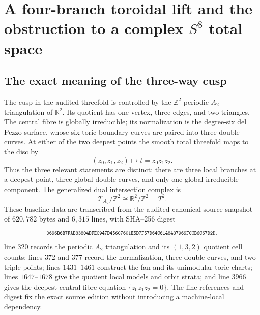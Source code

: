 
\section{A four-branch toroidal lift and the obstruction to a complex
\texorpdfstring{$S^8$}{S8} total space}
\label{hrftd:section}

\subsection{The exact meaning of the three-way cusp}
\label{hrftd:baseline}

The cusp in the audited threefold is controlled by the
\(\mathbb Z^2\)-periodic \(A_2\)-triangulation of \(\mathbb R^2\).  Its
quotient has one vertex, three edges, and two triangles.  The central fibre
is globally irreducible; its normalization is the degree-six del Pezzo
surface, whose six toric boundary curves are paired into three double curves.
At either of the two deepest points the smooth total threefold maps to the
disc by
\begin{equation}
 (z_0,z_1,z_2)\longmapsto t=z_0z_1z_2.
 \label{hrftd:eq:three-branch}
\end{equation}
Thus the three relevant statements are distinct: there are three local
branches at a deepest point, three global double curves, and only one global
irreducible component.  The generalized dual intersection complex is
\begin{equation}
 \mathcal T_{A_2}/\mathbb Z^2
 \cong \mathbb R^2/\mathbb Z^2=T^2.
 \label{hrftd:eq:dual-torus-two}
\end{equation}
These baseline data are transcribed from the audited canonical-source
snapshot of \(620{,}782\) bytes and \(6{,}315\) lines, with SHA--256 digest
\[
 \text{\scriptsize\ttfamily
 0696B6B7FAB83804DFEC947D45607601E5D7F57D64C6148487969FCCB6C67D2D}.
\]
line \(320\) records the periodic \(A_2\) triangulation and its
\((1,3,2)\) quotient cell counts; lines \(372\) and \(377\) record the
normalization, three double curves, and two triple points; lines
\(1431\)--\(1461\) construct the fan and its unimodular toric charts;
lines \(1647\)--\(1678\) give the quotient local models and orbit strata;
and line \(3966\) gives the deepest central-fibre equation
\(\{z_0z_1z_2=0\}\).  The line references and digest fix the exact source
edition without introducing a machine-local dependency.

